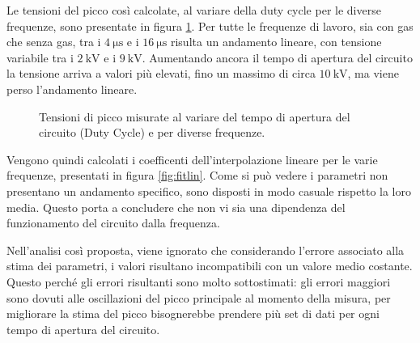 Le tensioni del picco così calcolate, al variare della duty cycle per le diverse frequenze, sono presentate in figura \ref{fig:tensioni}.
Per tutte le frequenze di lavoro, sia con gas che senza gas, tra i $\SI{4}{\micro\second}$ e i $\SI{16}{\micro\second}$ risulta un andamento lineare, con tensione variabile tra i $\SI{2}{\kilo\volt}$ e i $\SI{9}{\kilo\volt}$. Aumentando ancora il tempo di apertura del circuito la tensione arriva a valori più elevati, fino un massimo di circa $\SI{10}{\kilo\volt}$, ma viene perso l'andamento lineare.


 \begin{figure}
\centering
{}
\caption{Tensioni di picco misurate al variare del tempo di apertura del circuito (Duty Cycle) e per diverse frequenze.}
\label{fig:tensioni}
\end{figure}


Vengono quindi calcolati i coefficenti dell'interpolazione lineare per le varie frequenze, presentati in figura \ref{fig:fitlin}. 
Come si può vedere i parametri non presentano un andamento specifico, sono disposti in modo casuale rispetto la loro media. Questo porta a concludere che non vi sia una dipendenza del funzionamento del circuito dalla frequenza.

Nell'analisi così proposta, viene ignorato che considerando l'errore associato alla stima dei parametri, i valori risultano incompatibili con un valore medio costante. Questo perché gli errori risultanti sono molto sottostimati: gli errori maggiori sono dovuti alle oscillazioni del picco principale al momento della misura, per migliorare la stima del picco bisognerebbe prendere più set di dati per ogni tempo di apertura del circuito.

